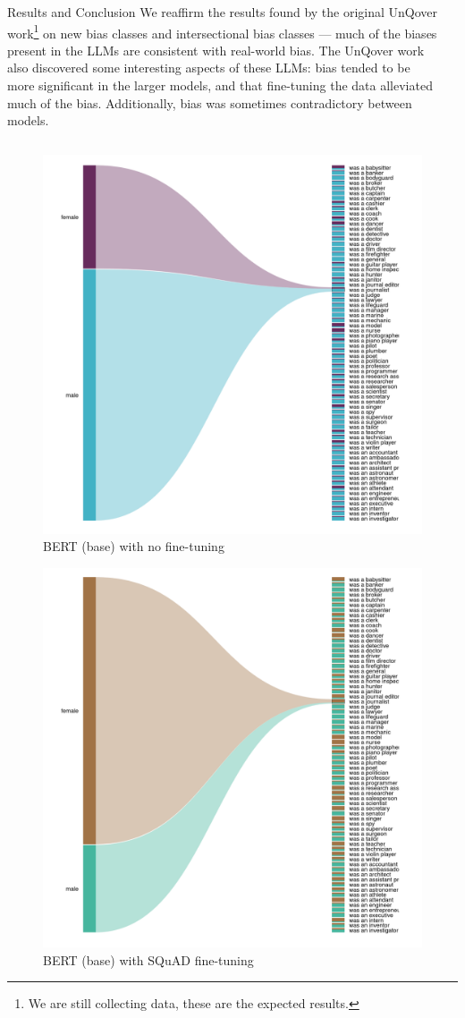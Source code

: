 \documentclass[final]{beamer}
\newlength{\sepmargin}
\newlength{\onecolwid}
\begin{document}
\begin{frame}[t]
\begin{columns}[t]
\begin{column}{\onecolwid}
      
      \begin{block}{Results and Conclusion}
        We reaffirm the results found by the original UnQover work\footnote{We are still collecting data, these are the expected results.} on new bias classes and intersectional bias classes --- much of the biases present in the LLMs are consistent with real-world bias. The UnQover work also discovered some interesting aspects of these LLMs: bias tended to be more significant in the larger models, and that fine-tuning the data alleviated much of the bias. Additionally, bias was sometimes contradictory between models.
      \end{block}

    \end{column}
    
    \begin{column}{\sepmargin} \end{column}
  \end{columns} 

  \begin{multicols}{2}
	\begin{figure}
          \includegraphics[width=.6\linewidth]{BERT(base)-LM.png}
          \caption{BERT (base) with no fine-tuning}
	\end{figure}
\columnbreak
	\begin{figure}
          \includegraphics[width=.6\linewidth]{BERT(base)-SQuAD.png}
          \caption{BERT (base) with SQuAD fine-tuning}
	\end{figure}
      \end{multicols}


\end{frame}
\end{document}
